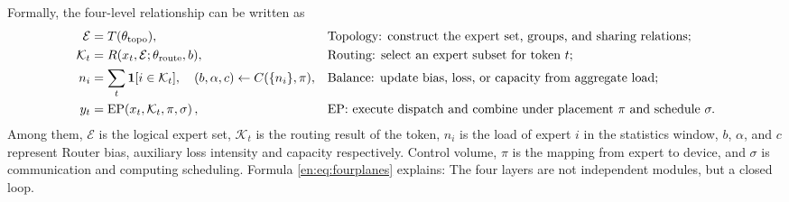 \documentclass[10pt,a4paper,fontset=none]{ctexart}
\begin{document}
Formally, the four-level relationship can be written as
\begin{align}
  \mathcal{E} &= T(\theta_{\mathrm{topo}}),
  &&\text{Topology: construct the expert set, groups, and sharing relations}; \notag\\
  \mathcal{K}_t &= R(x_t,\mathcal{E};\theta_{\mathrm{route}},b),
  &&\text{Routing: select an expert subset for token }t; \notag\\
  n_i &= \sum_t \mathbf{1}[i\in\mathcal{K}_t],\quad
  (b,\alpha,c)\leftarrow C(\{n_i\},\pi),
  &&\text{Balance: update bias, loss, or capacity from aggregate load}; \notag\\
  y_t &= \operatorname{EP}\!\left(x_t,\mathcal{K}_t,\pi,\sigma\right),
  &&\text{EP: execute dispatch and combine under placement }\pi\text{ and schedule }\sigma.
  \label{en:eq:fourplanes}
\end{align}
Among them, $\mathcal{E}$ is the logical expert set, $\mathcal{K}_t$ is the routing result of the token, $n_i$ is the load of expert $i$ in the statistics window, $b$, $\alpha$, and $c$ represent Router bias, auxiliary loss intensity and capacity respectively. Control volume, $\pi$ is the mapping from expert to device, and $\sigma$ is communication and computing scheduling. Formula \eqref{en:eq:fourplanes} explains: The four layers are not independent modules, but a closed loop.
\end{document}
